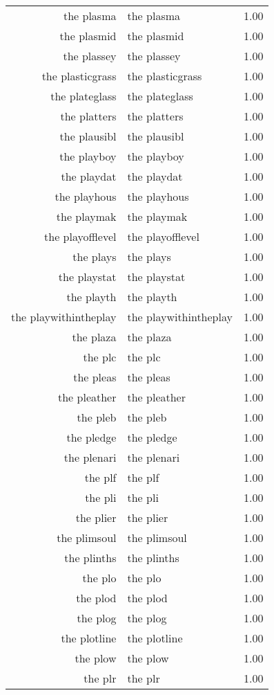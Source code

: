 \begin{table}[ht]
\begin{tabular}{rlr}
  the plasma & the plasma & 1.00 \\ 
  the plasmid & the plasmid & 1.00 \\ 
  the plassey & the plassey & 1.00 \\ 
  the plasticgrass & the plasticgrass & 1.00 \\ 
  the plateglass & the plateglass & 1.00 \\ 
  the platters & the platters & 1.00 \\ 
  the plausibl & the plausibl & 1.00 \\ 
  the playboy & the playboy & 1.00 \\ 
  the playdat & the playdat & 1.00 \\ 
  the playhous & the playhous & 1.00 \\ 
  the playmak & the playmak & 1.00 \\ 
  the playofflevel & the playofflevel & 1.00 \\ 
  the plays & the plays & 1.00 \\ 
  the playstat & the playstat & 1.00 \\ 
  the playth & the playth & 1.00 \\ 
  the playwithintheplay & the playwithintheplay & 1.00 \\ 
  the plaza & the plaza & 1.00 \\ 
  the plc & the plc & 1.00 \\ 
  the pleas & the pleas & 1.00 \\ 
  the pleather & the pleather & 1.00 \\ 
  the pleb & the pleb & 1.00 \\ 
  the pledge & the pledge & 1.00 \\ 
  the plenari & the plenari & 1.00 \\ 
  the plf & the plf & 1.00 \\ 
  the pli & the pli & 1.00 \\ 
  the plier & the plier & 1.00 \\ 
  the plimsoul & the plimsoul & 1.00 \\ 
  the plinths & the plinths & 1.00 \\ 
  the plo & the plo & 1.00 \\ 
  the plod & the plod & 1.00 \\ 
  the plog & the plog & 1.00 \\ 
  the plotline & the plotline & 1.00 \\ 
  the plow & the plow & 1.00 \\ 
  the plr & the plr & 1.00 \\ 

\end{tabular}
\end{table}
